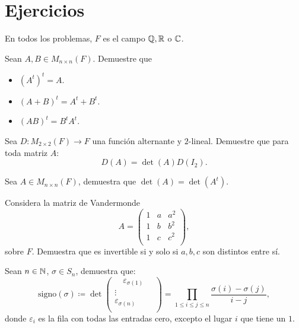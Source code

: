 \documentclass[12pt,a4paper]{book}
\newcommand{\parentesis}[1]{\left(#1\right)}
\begin{document}
    \section{Ejercicios}

    En todos los problemas, $F$ es el campo $\mathbb{Q}, \mathbb{R}$ o $\mathbb{C}$.

    \begin{ejercicio}
        Sean $A, B \in M_{n \times n}(F)$. Demuestre que
        \begin{itemize}
            \item[(a)] $\parentesis{A^t}^t = A$.
            \item[(b)] $\parentesis{A + B}^t = A^t + B^t$.
            \item[(c)] $\parentesis{AB}^t = B^t A^t$.
        \end{itemize}
    \end{ejercicio}

    \begin{ejercicio}
        Sea $D : M_{2 \times 2}(F) \to F$ una función alternante y $2$-lineal. Demuestre que para toda matriz $A$:
        \[
        D(A) =  \det(A) D(I_2).
        \]
    \end{ejercicio}

    \begin{ejercicio}
        Sea $A \in M_{n \times n}(F)$, demuestra que $\det(A) = \det(A^t)$.
    \end{ejercicio}

    \begin{ejercicio}
        Considera la matriz de Vandermonde
        \[
        A = 
        \begin{pmatrix}
            1 & a & a^2\\
            1 & b & b^2\\
            1 & c & c^2\\
        \end{pmatrix},
        \]
        sobre $F$. Demuestra que es invertible si y solo si $a, b, c$ son distintos entre sí.
    \end{ejercicio}

    \begin{ejercicio}
        Sean $n \in \mathbb{N}$, $\sigma \in S_n$, demuestra que:
        \[
        \text{signo}(\sigma) \coloneqq \det
        \begin{pmatrix}
            \quad \varepsilon_{\sigma (1)} \quad \\
            \vdots\\
            \varepsilon_{\sigma (n)}\\
        \end{pmatrix}
        = \prod_{1 \leq i \leq j \leq n} \frac{\sigma (i) - \sigma(j)}{i - j},
        \]
        donde $\varepsilon_i$ es la fila con todas las entradas cero, excepto el lugar $i$ que tiene un $1$.
    \end{ejercicio}


\end{document}

